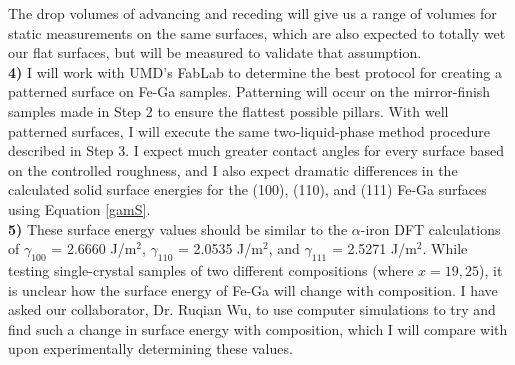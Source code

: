The drop volumes of advancing and receding \ca[s] will give us a range of volumes for static \ca measurements on the same surfaces, which are also expected to totally wet our flat surfaces, but will be measured to validate that assumption.\\
\textbf{4)} I will  work with UMD's FabLab to determine the best protocol for creating a patterned surface on Fe-Ga samples. Patterning will occur on the mirror-finish samples made in Step 2 to ensure the flattest possible pillars. With well patterned surfaces, I will execute the same two-liquid-phase method procedure described in Step 3. I expect much greater contact angles for every surface based on the controlled roughness, and I also expect dramatic differences in the calculated solid surface energies for the \hkl(100), \hkl(110), and \hkl(111) Fe-Ga surfaces using Equation \ref{gamS}. \\
\textbf{5)} These surface energy values should be similar to the $\alpha$-iron DFT calculations of $\gamma_{100}$ = 2.6660 J/m$^2$, $\gamma_{110}$ = 2.0535 J/m$^2$, and $\gamma_{111}$ = 2.5271 J/m$^2$.\cite{Wang2000} While testing single-crystal samples of two different compositions (\fegacomp where $x=19,25$), it is unclear how the surface energy of Fe-Ga will change with composition. I have asked our collaborator, Dr. Ruqian Wu, to use computer simulations to try and find such a change in surface energy with composition, which I will compare with upon experimentally determining these values. 




